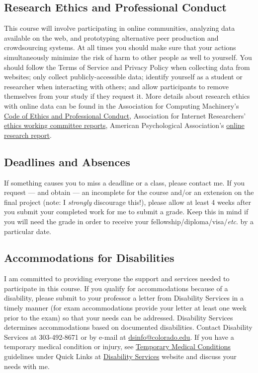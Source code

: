\documentclass[11pt]{memoir}
\begin{document}
\subsection{Research Ethics and Professional Conduct}
This course will involve participating in online communities, analyzing data available on the web, and prototyping alternative peer production and crowdsourcing systems. At all times you should make sure that your actions simultaneously minimize the risk of harm to other people as well to yourself. You should follow the Terms of Service and Privacy Policy when collecting data from websites; only collect publicly-accessible data; identify yourself as a student or researcher when interacting with others; and allow participants to remove themselves from your study if they request it. More details about research ethics with online data can be found in the Association for Computing Machinery's \href{https://www.acm.org/about-acm/acm-code-of-ethics-and-professional-conduct}{Code of Ethics and Professional Conduct}, Association for Internet Researchers' \href{http://aoir.org/ethics/}{ethics working committee reports}, American Psychological Association's \href{http://www.apa.org/science/leadership/bsa/internet/internet-report.aspx}{online research report}.

\subsection{Deadlines and Absences}
If something causes you to miss a deadline or a class, please contact me. If you request --- and obtain --- an incomplete for the course and/or an extension on the final project (note: I \textit{strongly} discourage this!), please allow at least 4 weeks after you submit your completed work for me to submit a grade. Keep this in mind if you will need the grade in order to receive your fellowship/diploma/visa/\textit{etc}. by a particular date.

\subsection{Accommodations for Disabilities}
I am committed to providing everyone the support and services needed to participate in this course. If you qualify for accommodations because of a disability, please submit to your professor a letter from Disability Services in a timely manner (for exam accommodations provide your letter at least one week prior to the exam) so that your needs can be addressed. Disability Services determines accommodations based on documented disabilities. Contact Disability Services at 303-492-8671 or by e-mail at \href{mailto:dsinfo@colorado.edu}{dsinfo@colorado.edu}. If you have a temporary medical condition or injury, see \href{http://www.colorado.edu/disabilityservices/students/temporary-medical-conditions}{Temporary Medical Conditions} guidelines under Quick Links at \href{http://www.colorado.edu/disabilityservices/students}{Disability Services} website and discuss your needs with me.
\end{document}

